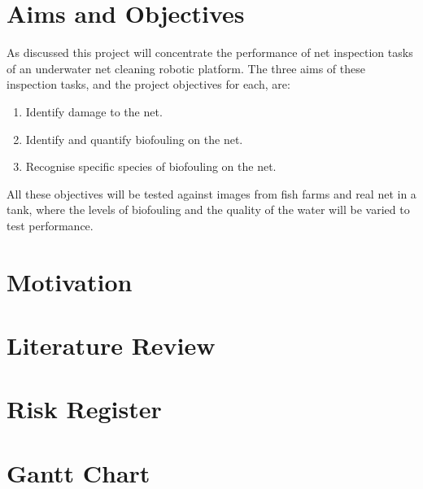 \documentclass[11.5pt, twoside, a4paper]{article}
\begin{document}
\section{Aims and Objectives}
As discussed this project will concentrate the performance of net inspection tasks of an underwater net cleaning robotic platform. The three aims of these inspection tasks, and the project objectives for each, are:
\begin{enumerate}
\item Identify damage to the net.
\item Identify and quantify biofouling on the net.
\item Recognise specific species of biofouling on the net.
\end{enumerate}
All these objectives will be tested against images from fish farms and real net in a tank, where the levels of biofouling and the quality of the water will be varied to test performance.


\section{Motivation}

\section{Literature Review}

\section{Risk Register}

\section{Gantt Chart}


{}
\end{document}
